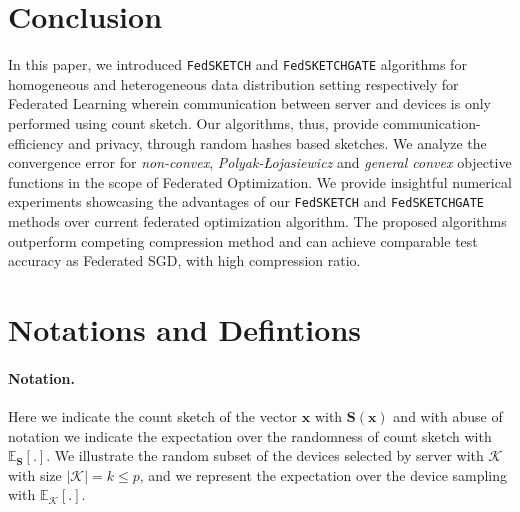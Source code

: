 \documentclass[twoside]{article}
\newcommand{\pl}{Polyak-\L{}ojasiewicz}
\begin{document}
\vspace{-0.1in}
\section{Conclusion}
\vspace{-0.05in}

In this paper, we introduced \texttt{FedSKETCH} and \texttt{FedSKETCHGATE} algorithms for homogeneous and heterogeneous data distribution setting respectively for Federated Learning wherein communication between server and devices is only performed using count sketch. 
Our algorithms, thus, provide communication-efficiency and privacy, through random hashes based sketches. 
We analyze the convergence error for \emph{non-convex}, \emph{\pl} and \emph{general convex} objective functions in the scope of Federated Optimization.  
We provide insightful numerical experiments showcasing the advantages of our \texttt{FedSKETCH} and \texttt{FedSKETCHGATE} methods over current federated optimization algorithm. The proposed algorithms outperform competing compression method and can achieve comparable test accuracy as Federated SGD, with high compression ratio.
\newpage



\newpage
\appendix
%

\onecolumn

  \hsize\textwidth
  \linewidth\hsize {}
 \bottomtitlebar 


\section{Notations and Defintions}

\paragraph{Notation.} Here we indicate the count sketch of the vector $\boldsymbol{x}$ with $\mathbf{S}(\boldsymbol{x})$ and with abuse of notation we indicate the expectation over the randomness of count sketch with $\mathbb{E}_{\mathbf{S}}[.]$. We illustrate the random subset of the devices selected by server with $\mathcal{K}$ with size $|\mathcal{K}|=k\leq p$, and we represent the expectation over the device sampling with $\mathbb{E}_{\mathcal{K}}[.]$. 
\end{document}
